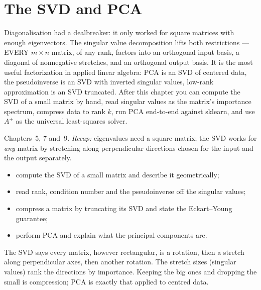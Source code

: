 \chapter{The SVD and PCA}\label{ch:svd}

Diagonalisation had a dealbreaker: it only worked for square matrices
with enough eigenvectors. The singular value decomposition lifts both
restrictions --- EVERY $m\times n$ matrix, of any rank, factors into an
orthogonal input basis, a diagonal of nonnegative stretches, and an
orthogonal output basis. It is the most useful factorization in applied
linear algebra: PCA is an SVD of centered data, the pseudoinverse is an
SVD with inverted singular values, low-rank approximation is an SVD
truncated. After this chapter you can compute the SVD of a small matrix
by hand, read singular values as the matrix's importance spectrum,
compress data to rank $k$, run PCA end-to-end against sklearn, and use
$A^{+}$ as the universal least-squares solver.

\begin{rulebox}
Chapters~5, 7 and~9. \emph{Recap:} eigenvalues need a square matrix; the SVD works for \emph{any} matrix by stretching along perpendicular directions chosen for the input and the output separately.
\end{rulebox}
\begin{wins}
\begin{itemize}
\item compute the SVD of a small matrix and describe it geometrically;
\item read rank, condition number and the pseudoinverse off the singular values;
\item compress a matrix by truncating its SVD and state the Eckart--Young guarantee;
\item perform PCA and explain what the principal components are.
\end{itemize}
\end{wins}
\begin{principle}
The SVD says every matrix, however rectangular, is a rotation, then a stretch along perpendicular axes, then another rotation. The stretch sizes (singular values) rank the directions by importance. Keeping the big ones and dropping the small is compression; PCA is exactly that applied to centred data.
\end{principle}

